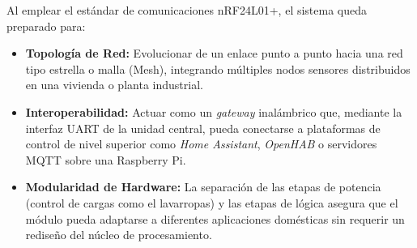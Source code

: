 \documentclass[12pt,a4paper]{article}
\begin{document}
Al emplear el estándar de comunicaciones nRF24L01+, el sistema queda preparado para:
\begin{itemize}
    \item \textbf{Topología de Red:} Evolucionar de un enlace punto a punto hacia una red tipo estrella o malla (Mesh), integrando múltiples nodos sensores distribuidos en una vivienda o planta industrial.
    \item \textbf{Interoperabilidad:} Actuar como un \textit{gateway} inalámbrico que, mediante la interfaz UART de la unidad central, pueda conectarse a plataformas de control de nivel superior como \textit{Home Assistant}, \textit{OpenHAB} o servidores MQTT sobre una Raspberry Pi.
    \item \textbf{Modularidad de Hardware:} La separación de las etapas de potencia (control de cargas como el lavarropas) y las etapas de lógica asegura que el módulo pueda adaptarse a diferentes aplicaciones domésticas sin requerir un rediseño del núcleo de procesamiento.
\end{itemize}
\end{document}
